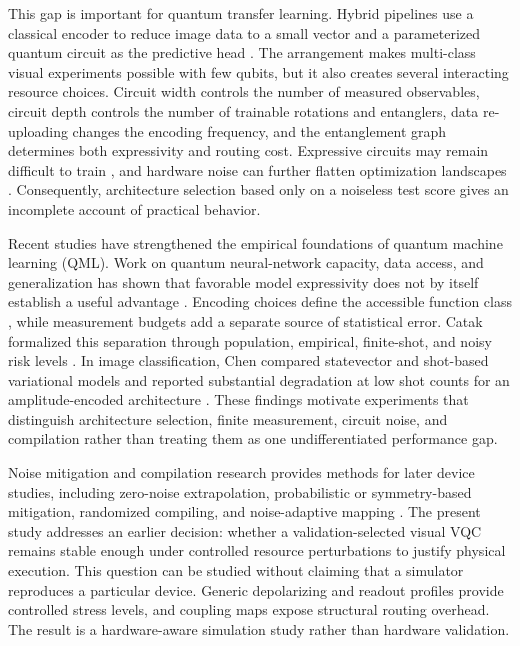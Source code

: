 \documentclass[pdflatex,sn-mathphys-num]{sn-jnl}
\begin{document}
This gap is important for quantum transfer learning. Hybrid pipelines use a classical encoder to reduce image data to a small vector and a parameterized quantum circuit as the predictive head \cite{MARI-2020,PEREZ-SALINAS-2020}. The arrangement makes multi-class visual experiments possible with few qubits, but it also creates several interacting resource choices. Circuit width controls the number of measured observables, circuit depth controls the number of trainable rotations and entanglers, data re-uploading changes the encoding frequency, and the entanglement graph determines both expressivity and routing cost. Expressive circuits may remain difficult to train \cite{MCCLEAN-2018,CEREZO-VQA-2021}, and hardware noise can further flatten optimization landscapes \cite{WANG-NOISE-2021}. Consequently, architecture selection based only on a noiseless test score gives an incomplete account of practical behavior.

Recent studies have strengthened the empirical foundations of quantum machine learning (QML). Work on quantum neural-network capacity, data access, and generalization has shown that favorable model expressivity does not by itself establish a useful advantage \cite{ABBAS-2021,HUANG-2021,CARO-2022,DU-2021,GIL-FUSTER-2024}. Encoding choices define the accessible function class \cite{SCHULD-ENCODING-2021}, while measurement budgets add a separate source of statistical error. Catak formalized this separation through population, empirical, finite-shot, and noisy risk levels \cite{CATAK-2026}. In image classification, Chen compared statevector and shot-based variational models and reported substantial degradation at low shot counts for an amplitude-encoded architecture \cite{CHEN-2024}. These findings motivate experiments that distinguish architecture selection, finite measurement, circuit noise, and compilation rather than treating them as one undifferentiated performance gap.

Noise mitigation and compilation research provides methods for later device studies, including zero-noise extrapolation, probabilistic or symmetry-based mitigation, randomized compiling, and noise-adaptive mapping \cite{TEMME-2017,ENDO-2021,JATTANA-2020,HASHIM-2021,MURALI-2019}. The present study addresses an earlier decision: whether a validation-selected visual VQC remains stable enough under controlled resource perturbations to justify physical execution. This question can be studied without claiming that a simulator reproduces a particular device. Generic depolarizing and readout profiles provide controlled stress levels, and coupling maps expose structural routing overhead. The result is a hardware-aware simulation study rather than hardware validation.
\end{document}
